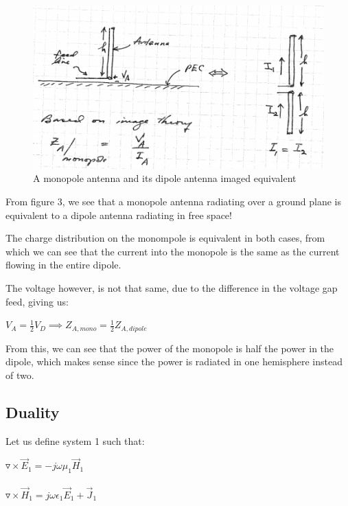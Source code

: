 \documentclass{article}
\begin{document}
\begin{figure}[H]
  \centering
     \includegraphics[scale=0.8]{Course Notes/images/8.3.png}
  \caption{A monopole antenna and its dipole antenna imaged equivalent}
\end{figure}

From figure 3, we see that a monopole antenna radiating over a ground plane is equivalent to a dipole antenna radiating in free space!

The charge distribution on the monompole is equivalent in both cases, from which we can see that the current into the monopole is the same as the current flowing in the entire dipole.

The voltage however, is not that same, due to the difference in the voltage gap feed, giving us:

\begin{center}
    $V_A = \frac{1}{2}V_D \implies Z_{A, mono} = \frac{1}{2} Z_{A, dipole}$
\end{center}

From this, we can see that the power of the monopole is half the power in the dipole, which makes sense since the power is radiated in one hemisphere instead of two.

\subsection{Duality}

Let us define system 1 such that:

\begin{center}
    $\triangledown \times \Vec{E}_1 = -j \omega \mu_1 \Vec{H}_1$ \\ 
    \hspace{0.1} \\
    $\triangledown \times \Vec{H}_1 = j \omega \epsilon_1 \Vec{E}_1 + \Vec{J}_1$ \\ 
    
\end{center}
\end{document}
